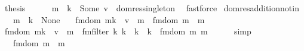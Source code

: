 \begin{isabellebody}
\ {\isacharquery}{\kern0pt}thesis\isanewline
\ \ \ \ \isamarkupfalse%
\ {\isacartoucheopen}m\ {\isachardollar}{\kern0pt}{\isachardollar}{\kern0pt}\ k\ {\isacharequal}{\kern0pt}\ Some\ v{\isacharprime}{\kern0pt}{\isacartoucheclose}\ \ dom{\isacharunderscore}{\kern0pt}res{\isacharunderscore}{\kern0pt}singleton\ \isamarkupfalse%
\ fastforce\isanewline
{}\isamarkupfalse%
%
\endisatagproof
{\isafoldproof}%
%
\isadelimproof
\isanewline
%
\endisadelimproof
\isanewline
{}\isamarkupfalse%
\ dom{\isacharunderscore}{\kern0pt}res{\isacharunderscore}{\kern0pt}addition{\isacharunderscore}{\kern0pt}not{\isacharunderscore}{\kern0pt}in{\isacharcolon}{\kern0pt}\isanewline
\ \ \ {\isachardoublequoteopen}m\ {\isachardollar}{\kern0pt}{\isachardollar}{\kern0pt}\ k\ {\isacharequal}{\kern0pt}\ None{\isachardoublequoteclose}\isanewline
\ \ \ {\isachardoublequoteopen}fmdom{\isacharprime}{\kern0pt}\ {\isacharparenleft}{\kern0pt}mk\ {\isachardollar}{\kern0pt}{\isachardollar}{\kern0pt}{\isacharcolon}{\kern0pt}{\isacharequal}{\kern0pt}\ v{\isacharparenright}{\kern0pt}{\isacharparenright}{\kern0pt}\ {\isasymlhd}\ m\ {\isacharequal}{\kern0pt}\ fmdom{\isacharprime}{\kern0pt}\ m\ {\isasymlhd}\ m\isanewline
%
\isadelimproof
%
\endisadelimproof
%
\isatagproof
{}\isamarkupfalse%
\ {\isacharminus}{\kern0pt}\isanewline
\ \ \isamarkupfalse%
\ {\isachardoublequoteopen}fmdom{\isacharprime}{\kern0pt}\ {\isacharparenleft}{\kern0pt}mk\ {\isachardollar}{\kern0pt}{\isachardollar}{\kern0pt}{\isacharcolon}{\kern0pt}{\isacharequal}{\kern0pt}\ v{\isacharparenright}{\kern0pt}{\isacharparenright}{\kern0pt}\ {\isasymlhd}\ m\ {\isacharequal}{\kern0pt}\ fmfilter\ {\isacharparenleft}{\kern0pt}{\isasymlambda}k{\isacharprime}{\kern0pt}{\isachardot}{\kern0pt}\ k{\isacharprime}{\kern0pt}\ {\isacharequal}{\kern0pt}\ k\ {\isasymor}\ k{\isacharprime}{\kern0pt}\ {\isasymin}\ fmdom{\isacharprime}{\kern0pt}\ m\ m\isanewline
\ \ \ \ \isamarkupfalse%
\ simp\isanewline
\ \ \isamarkupfalse%
\ \isamarkupfalse%
\ {\isachardoublequoteopen}{\isasymdots}\ {\isacharequal}{\kern0pt}\ fmdom{\isacharprime}{\kern0pt}\ m\ {\isasymlhd}\ m\isanewline

\end{isabellebody}
